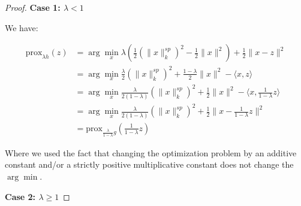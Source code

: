 \documentclass{article}
\begin{document}
\begin{proof}

\textbf{Case 1: $\lambda < 1$}

We have: 

\begin{align*}
    \text{prox}_{\lambda h} (z) &= \arg\min_{x} \lambda \left(\frac{1}{2} \left(\|x \|^{sp}_{k}\right)^2 - \frac{1}{2} \|x \|^2 \right) + \frac{1}{2} \| x - z\|^2\\
    &= \arg\min_{x} \frac{\lambda}{2} \left(\|x \|^{sp}_{k}\right)^2 + \frac{1-\lambda}{2} \|x \|^2  -  \langle x, z \rangle\\
        &= \arg\min_{x} \frac{\lambda}{2(1-\lambda)} \left(\|x \|^{sp}_{k}\right)^2  +\frac{1}{2} \|x \|^2  -  \langle x, \frac{1}{1-\lambda} z \rangle\\
        &= \arg\min_{x} \frac{\lambda}{2(1-\lambda)} \left(\|x \|^{sp}_{k}\right)^2  +\frac{1}{2} \|x - \frac{1}{1 - \lambda} z \|^2\\
        &= \text{prox}_{\frac{\lambda}{1- \lambda} g} (\frac{1}{1 - \lambda} z)
\end{align*}

Where we used the fact that changing the optimization problem by an additive constant and/or a strictly positive multiplicative constant does not change the $\arg\min$.

\textbf{Case 2: $\lambda \geq 1$}



\end{proof}
\end{document}
